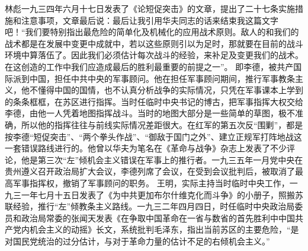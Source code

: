 \begin{maonote}
林彪一九三四年六月十七日发表了《论短促突击》的文章，提出了二十七条实施措施和注意事项，文章最后说：最后让我引用华夫同志的话来结束我这篇文字吧！“我们要特别指出最危险的简单化及机械化的应用战术原则。敌人的和我们的战术都是在发展中变更中成就中，若以这些原则引以为足时，那就要在目前的战斗环境中算落伍了。因此我们必须估计每次战斗的经验，来补足及变更我们的战术。在这创造的工作中我们应造成最后的胜利最重要的前提之一”。
即李德，被共产国际派到中国，担任中共中央的军事顾问。他在担任军事顾问期间，推行军事教条主义，他不懂得中国的国情，也不认真分析战争的实际情况，只凭在军事课本上学到的条条框框，在苏区进行指挥。当时任临时中央书记的博古，把军事指挥大权交给李德，由他一人凭着地图指挥战斗。当时的地图大部分是一些简单的草图，极不准确，所以他的指挥往往与前线实际情况差距很大。在红军的第五次反“围剿”，都是按李德“短促突击”、“两个拳头作战”、“御敌于国门之外”、建立正规军打阵地战这一套错误路线进行的。他曾以华夫为笔名在《革命与战争》杂志上发表了不少评论，他是第三次“左”倾机会主义错误在军事上的推行者。一九三五年一月党中央在贵州遵义召开政治局扩大会议，李德列席了会议，在受到会议批判后，被取消了最高军事指挥权，撤销了军事顾问的职务。
王明，实际主持当时临时中央工作，一九三一年七月十五日发表了《为中共更加布尔什维克化而斗争》的小册子，照搬苏联经验，推行“左”倾教条主义路线。一九三二年四月四日，时任临时中央政治局委员和政治局常委的张闻天发表《在争取中国革命在一省与数省的首先胜利中中国共产党内机会主义的动摇》长文，系统批判毛泽东，指出当前苏区的主要危险，“是对国民党统治的过分估计，与对于革命力量的估计不足的右倾机会主义。”
\end{maonote}
